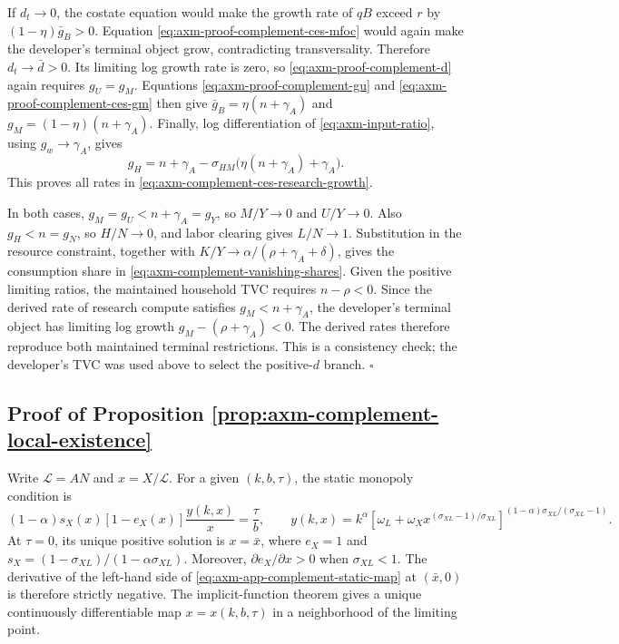If \(d_t\to0\), the costate equation would make the growth rate of \(qB\)
exceed \(r\) by \((1-\eta)\bar g_B>0\). Equation
\eqref{eq:axm-proof-complement-ces-mfoc} would again make the developer's
terminal object grow, contradicting transversality. Therefore
\(d_t\to\bar d>0\). Its limiting log growth rate is zero, so
\eqref{eq:axm-proof-complement-d} again requires \(g_U=g_M\). Equations
\eqref{eq:axm-proof-complement-gu} and
\eqref{eq:axm-proof-complement-ces-gm} then give
\(\bar g_B=\eta(n+\gamma_A)\) and
\(g_M=(1-\eta)(n+\gamma_A)\). Finally, log differentiation of
\eqref{eq:axm-input-ratio}, using \(g_w\to\gamma_A\), gives
\[
 g_H=n+\gamma_A-\sigma_{HM}\bigl(\eta(n+\gamma_A)+\gamma_A\bigr).
\]
This proves all rates in \eqref{eq:axm-complement-ces-research-growth}.

In both cases, \(g_M=g_U<n+\gamma_A=g_Y\), so \(M/Y\to0\) and \(U/Y\to0\). Also
\(g_H<n=g_N\), so \(H/N\to0\), and labor clearing gives \(L/N\to1\).
Substitution in the resource constraint, together with
\(K/Y\to\alpha/(\rho+\gamma_A+\delta)\), gives the consumption share in
\eqref{eq:axm-complement-vanishing-shares}. Given the positive limiting ratios,
the maintained household TVC requires \(n-\rho<0\). Since the derived rate of
research compute satisfies \(g_M<n+\gamma_A\), the developer's terminal object has
limiting log growth \(g_M-(\rho+\gamma_A)<0\). The derived rates therefore reproduce both
maintained terminal restrictions. This is a consistency check; the developer's
TVC was used above to select the positive-\(d\) branch. \(\square\)

\subsection{Proof of Proposition \ref{prop:axm-complement-local-existence}}

Write \(\mathcal L=AN\) and
\(x=X/\mathcal L\). For a given \((k,b,\tau)\), the static monopoly condition is
\begin{equation}
 (1-\alpha)s_X(x)[1-e_X(x)]\frac{y(k,x)}{x}
 =\frac{\tau}{b},
 \qquad
 y(k,x)=k^\alpha
 \left[\omega_L+\omega_Xx^{(\sigma_{XL}-1)/\sigma_{XL}}
 \right]^{(1-\alpha)\sigma_{XL}/(\sigma_{XL}-1)}.
 \label{eq:axm-app-complement-static-map}
\end{equation}
At \(\tau=0\), its unique positive solution is \(x=\bar x\), where
\(e_X=1\) and
\(s_X=(1-\sigma_{XL})/(1-\alpha\sigma_{XL})\). Moreover,
\(\partial e_X/\partial x>0\) when \(\sigma_{XL}<1\). The derivative of the
left-hand side of \eqref{eq:axm-app-complement-static-map} at
\((\bar x,0)\) is therefore strictly negative. The implicit-function theorem
gives a unique continuously differentiable map
\(x=x(k,b,\tau)\) in a neighborhood of the limiting point.


